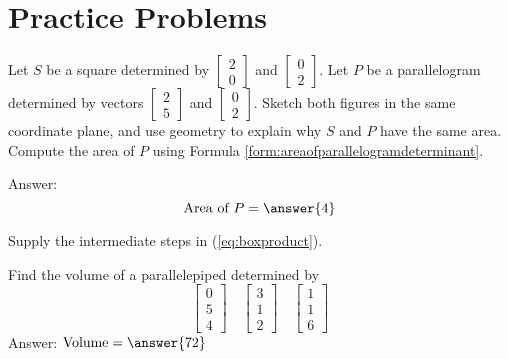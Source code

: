 \documentclass{ximera}
\begin{document}
\section*{Practice Problems}

\begin{problem}\label{prob:areasquareandparal} Let $S$ be a square determined by $\begin{bmatrix}2\\0\end{bmatrix}$ and $\begin{bmatrix}0\\2\end{bmatrix}$.  Let $P$ be a parallelogram determined by vectors $\begin{bmatrix}2\\5\end{bmatrix}$ and $\begin{bmatrix}0\\2\end{bmatrix}$.  Sketch both figures in the same coordinate plane, and use geometry to explain why $S$ and $P$ have the same area.  Compute the area of $P$ using Formula \ref{form:areaofparallelogramdeterminant}.

Answer: $$\text{Area of }P=\answer{4}$$
\end{problem}

\begin{problem}\label{prob:boxprductproof}
Supply the intermediate steps in (\ref{eq:boxproduct}).
\end{problem}

\begin{problem}\label{prob:volparallelepiped}
Find the volume of a parallelepiped determined by 
$$\begin{bmatrix}0\\5\\4\end{bmatrix}\quad\begin{bmatrix}3\\1\\2\end{bmatrix}\quad\begin{bmatrix}1\\1\\6\end{bmatrix}$$
Answer: $\mbox{Volume}=\answer{72}$
\end{problem}
\end{document}
